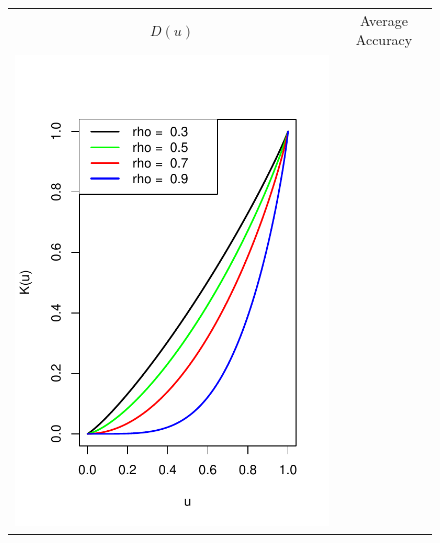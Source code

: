 \documentclass[twoside,11pt]{article}
\newenvironment{myfont}{\fontfamily{phv}\selectfont}{\par}
\begin{document}
\begin{figure}[h]
\centering
\begin{tabular}{cc}
\begin{myfont}\hspace{0.2in}$D(u)$\end{myfont} &
\begin{myfont}\hspace{0.4in}Average Accuracy\end{myfont} \\
\includegraphics[scale = 0.6, clip = true, trim = 0.22in 0 0.2in 0.6in]{illus_rhos_Kfunc.pdf} &

\end{tabular}
\end{figure}
\end{document}

